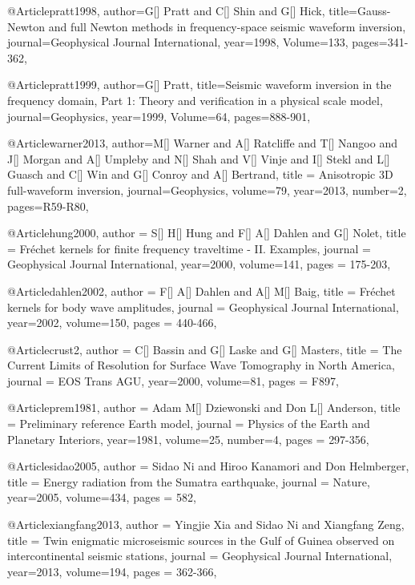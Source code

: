 @Article{pratt1998,
  author={G[] Pratt and C[] Shin and G[] Hick},
  title={Gauss-{N}ewton and full {N}ewton methods in frequency-space seismic waveform inversion},
  journal={Geophysical Journal International},
  year=1998,
  Volume=133,
  pages={341-362},
}

@Article{pratt1999,
  author={G[] Pratt},
  title={Seismic waveform inversion in the frequency domain, {P}art 1: {T}heory and verification in a physical scale model},
  journal={Geophysics},
  year=1999,
  Volume=64,
  pages={888-901},
}

@Article{warner2013,
  author={M[] Warner and A[] Ratcliffe and T[] Nangoo and J[] Morgan and A[] Umpleby and N[] Shah and V[] Vinje and I[] Stekl and L[] Guasch and C[] Win and G[] Conroy and A[] Bertrand},
  title = {Anisotropic 3{D} full-waveform inversion},
  journal={Geophysics},
  volume=79,
  year=2013,
  number=2,
  pages={R59-R80},
}

@Article{hung2000,
  author =	 {S[] H[] Hung and F[] A[] Dahlen and G[] Nolet},
  title =	 {Fr\'{e}chet kernels for finite frequency traveltime - {II}. Examples},
  journal =	 {Geophysical Journal International},
  year=2000,
  volume=141,
  pages =	 {175-203},
}


@Article{dahlen2002,
  author =	 {F[] A[] Dahlen and A[] M[] Baig},
  title =	 {Fr\'{e}chet kernels for body wave amplitudes},
  journal =	 {Geophysical Journal International},
  year=2002,
  volume=150,
  pages =	 {440-466},
}


@Article{crust2,
  author =	 {C[] Bassin and G[] Laske and G[] Masters},
  title =	 {The Current Limits of Resolution for Surface Wave Tomography in North America},
  journal =	 {EOS Trans AGU},
  year=2000,
  volume=81,
  pages =	 {F897},
}

@Article{prem1981,
  author =	 {Adam M[] Dziewonski and Don L[] Anderson},
  title =	 {Preliminary reference Earth model},
  journal =	 {Physics of the Earth and Planetary Interiors},
  year=1981,
  volume=25,
  number=4,
  pages =	 {297-356},
}



@Article{sidao2005,
  author =	 {Sidao Ni and Hiroo Kanamori and Don Helmberger},
  title =	 {Energy radiation from the Sumatra earthquake},
  journal =	 {Nature},
  year=2005,
  volume=434,
  pages =	 {582},
}

@Article{xiangfang2013,
  author =	 {Yingjie Xia and Sidao Ni and Xiangfang Zeng},
  title =	 {Twin enigmatic microseismic sources in the Gulf of Guinea observed on intercontinental seismic stations},
  journal =	 {Geophysical Journal International},
  year=2013,
  volume=194,
  pages =	 {362-366},
}

